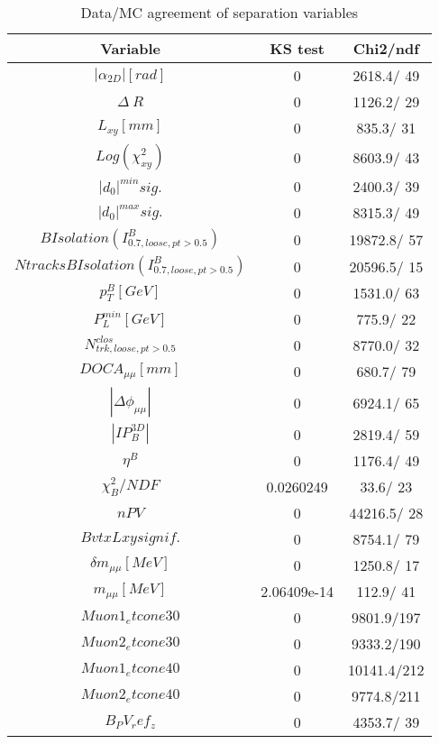 \documentclass{article}
\begin{document}
\begin{table}[htbp]
\caption{\label{tab:sepVars}Data/MC agreement of separation variables}
\begin{center}
\begin{tabular}{c|c|c}
Variable & KS test & Chi2/ndf \\
\hline
$|\alpha_{2D}| [rad]$ & 0 & 2618.4/ 49\\
\hline
$\Delta~R$ & 0 & 1126.2/ 29\\
\hline
$L_{xy} [mm]$ & 0 & 835.3/ 31\\
\hline
$Log(\chi^{2}_{xy})$ & 0 & 8603.9/ 43\\
\hline
$|d_{0}|^{min} sig.$ & 0 & 2400.3/ 39\\
\hline
$|d_{0}|^{max} sig.$ & 0 & 8315.3/ 49\\
\hline
$B Isolation (I^{B}_{0.7, loose, pt>0.5})$ & 0 & 19872.8/ 57\\
\hline
$Ntracks B Isolation (I^{B}_{0.7, loose, pt>0.5})$ & 0 & 20596.5/ 15\\
\hline
$p_{T}^{B} [GeV]$ & 0 & 1531.0/ 63\\
\hline
$P^{min}_{L} [GeV]$ & 0 & 775.9/ 22\\
\hline
$N^{clos}_{trk, loose, pt>0.5}$ & 0 & 8770.0/ 32\\
\hline
$DOCA_{\mu\mu} [mm]$ & 0 & 680.7/ 79\\
\hline
$|\Delta\phi_{\mu\mu}|$ & 0 & 6924.1/ 65\\
\hline
$|IP_{B}^{3D}|$ & 0 & 2819.4/ 59\\
\hline
$\eta^{B}$ & 0 & 1176.4/ 49\\
\hline
$\chi^{2}_{B}/NDF$ & 0.0260249 &  33.6/ 23\\
\hline
$nPV$ & 0 & 44216.5/ 28\\
\hline
$BvtxLxy signif.$ & 0 & 8754.1/ 79\\
\hline
$\delta m_{\mu\mu} [MeV]$ & 0 & 1250.8/ 17\\
\hline
$m_{\mu\mu} [MeV]$ & 2.06409e-14 & 112.9/ 41\\
\hline
$Muon1_etcone30$ & 0 & 9801.9/197\\
\hline
$Muon2_etcone30$ & 0 & 9333.2/190\\
\hline
$Muon1_etcone40$ & 0 & 10141.4/212\\
\hline
$Muon2_etcone40$ & 0 & 9774.8/211\\
\hline
$B_PV_ref_z$ & 0 & 4353.7/ 39\\
\hline
\end{tabular}
\end{center}
\end{table}
\end{document}
